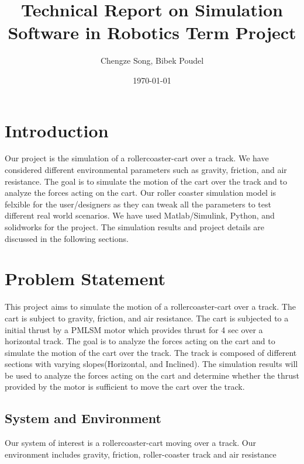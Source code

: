 \documentclass{article}
\title{Technical Report on Simulation Software in Robotics Term Project}
\author{Chengze Song, Bibek Poudel}
\date{\today}
\begin{document}
    \maketitle

    \section{Introduction}
    Our project is the simulation of a rollercoaster-cart over a track. We have considered
    different environmental parameters such as gravity, friction, and air resistance.
    The goal is to simulate the motion of the cart over the track and to analyze
    the forces acting on the cart. Our roller coaster simulation model is felxible
    for the user/designers as they can tweak all the parameters to test different
    real world scenarios. We have used Matlab/Simulink, Python, and solidworks
    for the project. The simulation results and project details are discussed in
    the following sections.

    \section{Problem Statement}
    This project aims to simulate the motion of a rollercoaster-cart over a track.
    The cart is subject to gravity, friction, and air resistance. The cart is subjected
    to a initial thrust by a PMLSM motor which provides thrust for 4 sec over a horizontal
    track. The goal is to analyze the forces acting on the cart and to simulate
    the motion of the cart over the track. The track is composed of different sections
    with varying slopes(Horizontal, and Inclined). The simulation results will
    be used to analyze the forces acting on the cart and determine whether the
    thrust provided by the motor is sufficient to move the cart over the track.
    \subsection{System and Environment}
    Our system of interest is a rollercoaster-cart moving over a track. Our
    environment includes gravity, friction, roller-coaster track and air
    resistance
\end{document}
